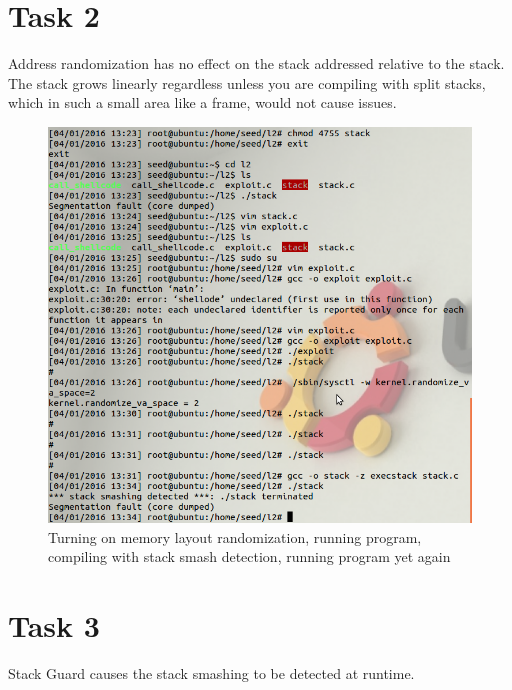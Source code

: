 \documentclass{article}
\begin{document}
  \section{Task 2}

  Address randomization has no effect on the stack addressed relative to the stack. The stack grows linearly regardless unless you are compiling with split stacks, which in such a small area like a frame, would not cause issues.

  \begin{figure}
    \centering
    \includegraphics[width=\textwidth]{ss/4.png}
    \caption{Turning on memory layout randomization, running program, compiling with stack smash detection, running program yet again}
  \end{figure}

  \section{Task 3}

  Stack Guard causes the stack smashing to be detected at runtime.
\end{document}
